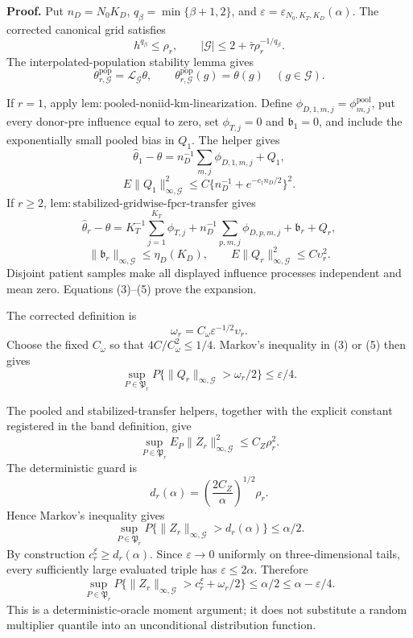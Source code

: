 \textbf{Proof.}
Put \(n_D=N_0K_D\), \(q_\beta=\min\{\beta+1,2\}\), and \(\varepsilon=\varepsilon_{N_0,K_T,K_D}(\alpha)\). The corrected canonical grid satisfies
\[
 h^{q_\beta}\le\rho_r,
 \qquad |\mathcal G|\le2+\bar\tau\rho_r^{-1/q_\beta}. \tag{1}
\]
The interpolated-population stability lemma gives
\[
 \theta^{\mathrm{pop}}_{r,\mathcal G}
 =\mathcal L_{\mathcal G}\theta,
 \qquad
 \theta^{\mathrm{pop}}_{r,\mathcal G}(g)=\theta(g)
 \quad(g\in\mathcal G).                                  \tag{2}
\]

If \(r=1\), apply \(\mathrm{lem:pooled\mbox{-}noniid\mbox{-}km\mbox{-}linearization}\). Define \(\phi_{D,1,m,j}=\phi_{m,j}^{\mathrm{pool}}\), put every donor-pre influence equal to zero, set \(\phi_{T,j}=0\) and \(\mathfrak b_1=0\), and include the exponentially small pooled bias in \(Q_1\). The helper gives
\[
 \widehat\theta_1-\theta
 =n_D^{-1}\sum_{m,j}\phi_{D,1,m,j}+Q_1,
\]
\[
 E\|Q_1\|_{\infty,\mathcal G}^2
 \le C\{n_D^{-1}+e^{-c_\dagger n_D/2}\}^2.             \tag{3}
\]
If \(r\ge2\), \(\mathrm{lem:stabilized\mbox{-}gridwise\mbox{-}fpcr\mbox{-}transfer}\) gives
\[
 \widehat\theta_r-\theta
 =K_T^{-1}\sum_{j=1}^{K_T}\phi_{T,j}
 +n_D^{-1}\sum_{p,m,j}\phi_{D,p,m,j}
 +\mathfrak b_r+Q_r,                                      \tag{4}
\]
\[
 \|\mathfrak b_r\|_{\infty,\mathcal G}\le\eta_D(K_D),
 \qquad E\|Q_r\|_{\infty,\mathcal G}^2\le C\upsilon_r^2. \tag{5}
\]
Disjoint patient samples make all displayed influence processes independent and mean zero. Equations (3)--(5) prove the expansion.

The corrected definition is
\[
 \omega_r=C_\omega\varepsilon^{-1/2}\upsilon_r.        \tag{6}
\]
Choose the fixed \(C_\omega\) so that \(4C/C_\omega^2\le1/4\). Markov's inequality in (3) or (5) then gives
\[
 \sup_{P\in\mathfrak P_r}
 P\{\|Q_r\|_{\infty,\mathcal G}>\omega_r/2\}
 \le\varepsilon/4.                                       \tag{7}
\]

The pooled and stabilized-transfer helpers, together with the explicit constant registered in the band definition, give
\[
 \sup_{P\in\mathfrak P_r}E_P
 \|Z_r\|_{\infty,\mathcal G}^2\le C_Z\rho_r^2.          \tag{8}
\]
The deterministic guard is
\[
 d_r(\alpha)=\left(\frac{2C_Z}{\alpha}\right)^{1/2}\rho_r.
\]
Hence Markov's inequality gives
\[
 \sup_{P\in\mathfrak P_r}
 P\{\|Z_r\|_{\infty,\mathcal G}>d_r(\alpha)\}
 \le\alpha/2.                                            \tag{9}
\]
By construction \(c_r^\xi\ge d_r(\alpha)\). Since \(\varepsilon\to0\) uniformly on three-dimensional tails, every sufficiently large evaluated triple has \(\varepsilon\le2\alpha\). Therefore
\[
 \sup_{P\in\mathfrak P_r}
 P\{\|Z_r\|_{\infty,\mathcal G}>c_r^\xi+\omega_r/2\}
 \le\alpha/2\le\alpha-\varepsilon/4.                  \tag{10}
\]
This is a deterministic-oracle moment argument; it does not substitute a random multiplier quantile into an unconditional distribution function.


